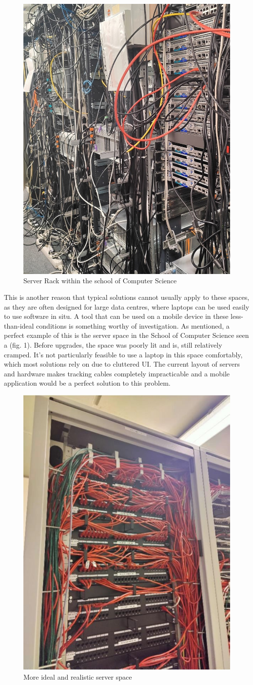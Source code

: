 \documentclass [12pt,letterpaper]{article}
\begin{document}
\begin{figure}[ht]
    \centering
    \includegraphics[width=0.4\linewidth]{images/server_racks.jpg}
    \caption{Server Rack within the school of Computer Science}
\end{figure}

This is another reason that typical solutions cannot usually apply to these spaces, as they are often designed for large data centres, where laptops can be used easily to use software in situ. A tool that can be used on a mobile device in these less-than-ideal conditions is something worthy of investigation. As mentioned, a perfect example of this is the server space in the School of Computer Science seen a (fig. 1). Before upgrades, the space was poorly lit and is, still relatively cramped. It’s not particularly feasible to use a laptop in this space comfortably, which most solutions rely on due to cluttered UI. The current layout of servers and hardware makes tracking cables completely impracticable and a mobile application would be a perfect solution to this problem. 


\begin{figure}[ht]
    \centering
    \includegraphics[width=0.4\linewidth]{images/server_racks_clean.jpg}
    \caption{More ideal and realistic server space}
\end{figure}
\end{document}
